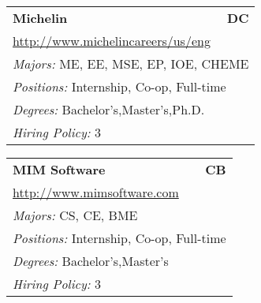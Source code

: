 \documentclass[twoside]{article}
\begin{document}
\begin{center}
\begin{multicols}{3}
\begin{FlushLeft}
\begin{minipage}{.9\columnwidth}
\end{minipage}
 
\begin{minipage}{.9\columnwidth}\begin{tabularx}{.95\columnwidth}{Xr}
                 {\Large\bf Michelin} & {\Large\bf DC}\\
    \multicolumn{2}{p{.95\columnwidth}}{\url{http://www.michelincareers/us/eng}}\\
    \multicolumn{2}{p{.95\columnwidth}}{\emph{Majors:} ME, EE, MSE, EP, IOE, CHEME}\\
    \multicolumn{2}{p{.95\columnwidth}}{\emph{Positions:} Internship, Co-op, Full-time}\\
    \multicolumn{2}{p{.95\columnwidth}}{\emph{Degrees:} Bachelor's,Master's,Ph.D.}\\
    \multicolumn{2}{p{.95\columnwidth}}{\emph{Hiring Policy:} 3}\\
    \end{tabularx}
    
\end{minipage}
 
\begin{minipage}{.9\columnwidth}\begin{tabularx}{.95\columnwidth}{Xr}
                 {\Large\bf MIM Software} & {\Large\bf CB}\\
    \multicolumn{2}{p{.95\columnwidth}}{\url{http://www.mimsoftware.com}}\\
    \multicolumn{2}{p{.95\columnwidth}}{\emph{Majors:} CS, CE, BME}\\
    \multicolumn{2}{p{.95\columnwidth}}{\emph{Positions:} Internship, Co-op, Full-time}\\
    \multicolumn{2}{p{.95\columnwidth}}{\emph{Degrees:} Bachelor's,Master's}\\
    \multicolumn{2}{p{.95\columnwidth}}{\emph{Hiring Policy:} 3}\\
    \end{tabularx}
    
\end{minipage}
 

\end{FlushLeft}
\end{multicols}
\end{center}
\end{document}
